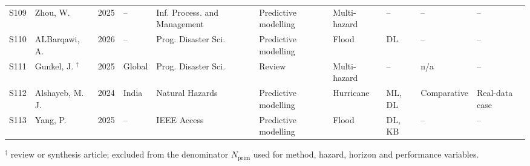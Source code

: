 \begin{landscape}
\begin{longtable}{@{}p{1.0cm}p{3.3cm}p{0.8cm}p{2.3cm}p{3.1cm}p{2.6cm}p{2.2cm}p{1.9cm}p{2.3cm}p{2.2cm}@{}}
S109 & Zhou, W. \cite{Zhou2025ClassificationSeverityDisasterLosses} & 2025 & -- & Inf. Process. and Management & Predictive modelling & Multi-hazard & -- & -- & -- \\
S110 & ALBarqawi, A. \cite{ALBarqawi2026FloodInundationDeepLearning} & 2026 & -- & Prog. Disaster Sci. & Predictive modelling & Flood & DL & -- & -- \\
S111 & Gunkel, J. \cite{Gunkel2025MachineLearningHumanMobility}$^{\dagger}$ & 2025 & Global & Prog. Disaster Sci. & Review & Multi-hazard & -- & n/a & -- \\
S112 & Alshayeb, M. J. \cite{Alshayeb2024ExplainableStormSurgeSusceptibility} & 2024 & India & Natural Hazards & Predictive modelling & Hurricane & ML, DL & Comparative & Real-data case \\
S113 & Yang, P. \cite{Yang2025KnowledgeGraphGraphNeuralFloodRisk} & 2025 & -- & IEEE Access & Predictive modelling & Flood & DL, KB & -- & -- \\
\end{longtable}
\footnotesize $^{\dagger}$ review or synthesis article; excluded from the denominator $N_{\mathrm{prim}}$ used for method, hazard, horizon and performance variables.
\normalsize
\end{landscape}

